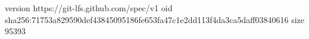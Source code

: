 version https://git-lfs.github.com/spec/v1
oid sha256:71753a829590def43845095186fe653fa47c1e2dd113f4da3ca5daff03840616
size 95393
